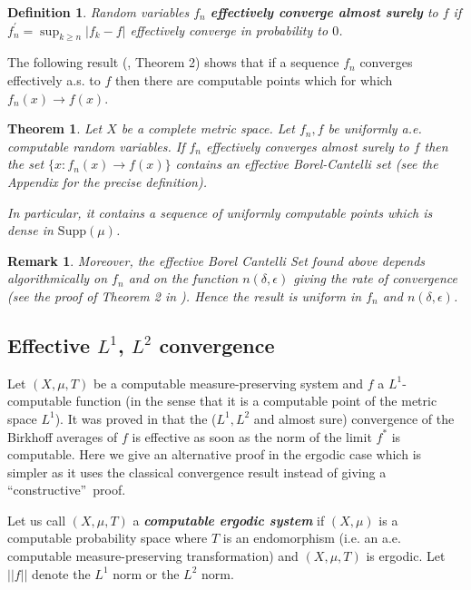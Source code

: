 \documentclass[copyright,creativecommons]{eptcs}
\newtheorem{theorem}{Theorem}
\newtheorem{definition}{Definition}
\newtheorem{remark}{Remark}
\numberwithin{equation}{section}
\begin{document}
\begin{definition}
\label{def_rec_conv}Random variables $f_{n}$ \textbf{\emph{effectively
converge almost surely}} to $f$ if $f_{n}^{\prime }=\sup_{k\geq n}|f_{k}-f|$
effectively converge in probability to $0$.
\end{definition}

The following result (\cite{GHR07}, Theorem 2) shows that if a sequence $f_{n}$ converges effectively a.s. to $f$ then there are computable points
which for which $f_{n}(x)\rightarrow f(x)$.

\begin{theorem}
\label{theorem_convergence_Borel_Cantelli} Let $X$ be a complete metric
space. Let $f_{n},f$ be uniformly a.e. computable random variables. If $f_{n} $ effectively converges almost surely to $f$ then the set $\{x:f_{n}(x)\rightarrow f(x)\}$ contains an effective Borel-Cantelli set
(see the Appendix for the precise definition).

In particular, it contains a sequence of uniformly computable points which
is dense in $\mathrm{Supp}(\mu )$.
\end{theorem}

\begin{remark}
\label{remarkmistery}Moreover, the effective Borel Cantelli Set found above
depends algorithmically on $f_{n}$ and on the function $n(\delta,\epsilon)$
giving the rate of convergence (see the proof of Theorem 2 in \cite{GHR07}).
Hence the result is uniform in $f_n$ and $n(\delta,\epsilon)$.
\end{remark}

\subsection{Effective $L^{1}$, $L^{2}$ convergence}

Let $(X,\mu ,T)$ be a computable measure-preserving system and $f$ a $L^{1}$-computable function (in the sense that it is a computable point of the
metric space $L^{1}$). It was proved in \cite{AvigadGT10} that the ($
L^{1},L^{2}$ and almost sure) convergence of the Birkhoff averages of $f$ is
effective as soon as the norm of the limit $f^{\ast }$ is computable. Here we give an
alternative proof in the ergodic case which is simpler as it uses the classical convergence
result instead of giving a \textquotedblleft constructive\textquotedblright\
proof.

Let us call $(X,\mu ,T)$ a \textbf{\emph{computable ergodic system}} if $(X,\mu )$ is a computable probability space where $T$ is an endomorphism
(i.e. an a.e. computable measure-preserving transformation) and $(X,\mu ,T)$
is ergodic. Let $||f||$ denote the $L^{1}$ norm or the $L^{2}$ norm.
\end{document}
